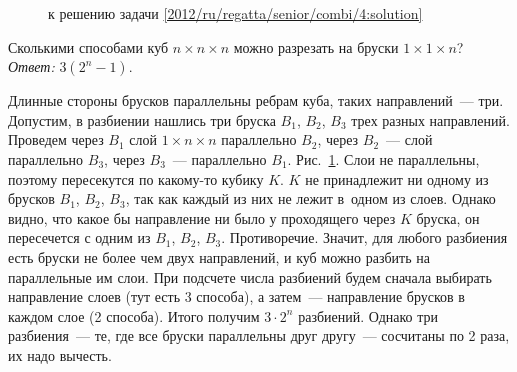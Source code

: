 \ifsolution
\begin{figure}\centering
    \caption{к решению задачи \ref{2012/ru/regatta/senior/combi/4:solution}}
    \label{2012/ru/regatta/senior/combi/4:solution:fig}
\end{figure}%
\fi %

\problem
Сколькими способами куб $n \times n \times n$ можно разрезать на бруски
$1 \times 1 \times n$?
\solution
\label{2012/ru/regatta/senior/combi/4:solution}%
\emph{Ответ:} $3(2^n - 1)$.
\par
Длинные стороны брусков параллельны ребрам куба, таких направлений~--- три.
Допустим, в разбиении нашлись три бруска $B_1$, $B_2$, $B_3$ трех разных
направлений.
Проведем через $B_1$ слой $1 \times n \times n$ параллельно $B_2$,
через $B_2$~--- слой параллельно $B_3$, через $B_3$~--- параллельно $B_1$.
Рис.~\ref{2012/ru/regatta/senior/combi/4:solution:fig}.
Слои не параллельны, поэтому пересекутся по какому-то кубику $K$.
$K$ не принадлежит ни одному из брусков $B_1$, $B_2$, $B_3$, так как каждый из
них не лежит в~одном из слоев.
Однако видно, что какое бы направление ни было у проходящего через $K$ бруска,
он пересечется с одним из $B_1$, $B_2$, $B_3$.
Противоречие.
Значит, для любого разбиения есть бруски не более чем двух направлений, и куб
можно разбить на параллельные им слои.
При подсчете числа разбиений будем сначала выбирать направление слоев
(тут есть 3 способа), а затем~--- направление брусков в каждом слое
(2 способа).
Итого получим $3 \cdot 2^n$ разбиений.
Однако три разбиения~--- те, где все бруски параллельны друг другу~---
сосчитаны по 2 раза, их надо вычесть.
\endproblem

